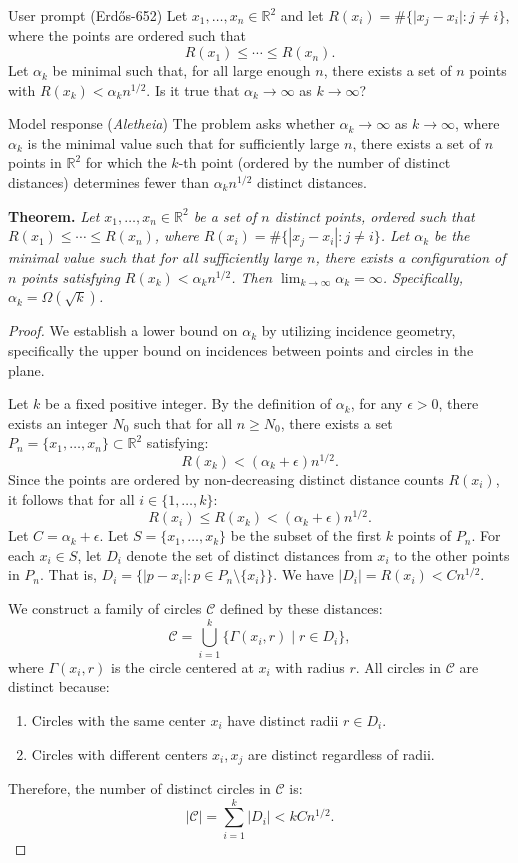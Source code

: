 \documentclass[11pt]{article}
\begin{document}
\begin{problem}{User prompt (Erd\H{o}s-652)}
Let $x_1,\ldots,x_n\in \mathbb{R}^2$ and let $R(x_i)=\#\{ \lvert x_j-x_i\rvert : j\neq i\}$, where the points are ordered such that\[R(x_1)\leq \cdots \leq R(x_n).\]Let $\alpha_k$ be minimal such that, for all large enough $n$, there exists a set of $n$ points with $R(x_k)<\alpha_kn^{1/2}$. Is it true that $\alpha_k\to \infty$ as $k\to \infty$?
\end{problem}


\begin{solution}{Model response (\emph{Aletheia})}
The problem asks whether $\alpha_k \to \infty$ as $k \to \infty$, where $\alpha_k$ is the minimal value such that for sufficiently large $n$, there exists a set of $n$ points in $\mathbb{R}^2$ for which the $k$-th point (ordered by the number of distinct distances) determines fewer than $\alpha_k n^{1/2}$ distinct distances.

\textbf{Theorem.} \textit{Let $x_1, \ldots, x_n \in \mathbb{R}^2$ be a set of $n$ distinct points, ordered such that $R(x_1) \leq \cdots \leq R(x_n)$, where $R(x_i) = \#\{ |x_j - x_i| : j \neq i \}$. Let $\alpha_k$ be the minimal value such that for all sufficiently large $n$, there exists a configuration of $n$ points satisfying $R(x_k) < \alpha_k n^{1/2}$. Then $\lim_{k \to \infty} \alpha_k = \infty$. Specifically, $\alpha_k = \Omega(\sqrt{k})$.}

\begin{proof}
We establish a lower bound on $\alpha_k$ by utilizing incidence geometry, specifically the upper bound on incidences between points and circles in the plane.

Let $k$ be a fixed positive integer. By the definition of $\alpha_k$, for any $\epsilon > 0$, there exists an integer $N_0$ such that for all $n \geq N_0$, there exists a set $P_n = \{x_1, \ldots, x_n\} \subset \mathbb{R}^2$ satisfying:
\[ R(x_k) < (\alpha_k + \epsilon) n^{1/2}. \]
Since the points are ordered by non-decreasing distinct distance counts $R(x_i)$, it follows that for all $i \in \{1, \ldots, k\}$:
\[ R(x_i) \leq R(x_k) < (\alpha_k + \epsilon) n^{1/2}. \]
Let $C = \alpha_k + \epsilon$. Let $S = \{x_1, \ldots, x_k\}$ be the subset of the first $k$ points of $P_n$. For each $x_i \in S$, let $D_i$ denote the set of distinct distances from $x_i$ to the other points in $P_n$. That is, $D_i = \{ |p - x_i| : p \in P_n \setminus \{x_i\} \}$. We have $|D_i| = R(x_i) < C n^{1/2}$.

We construct a family of circles $\mathcal{C}$ defined by these distances:
\[ \mathcal{C} = \bigcup_{i=1}^k \{ \Gamma(x_i, r) \mid r \in D_i \}, \]
where $\Gamma(x_i, r)$ is the circle centered at $x_i$ with radius $r$.
All circles in $\mathcal{C}$ are distinct because:
\begin{enumerate}
    \item Circles with the same center $x_i$ have distinct radii $r \in D_i$.
    \item Circles with different centers $x_i, x_j$ are distinct regardless of radii.
\end{enumerate}
Therefore, the number of distinct circles in $\mathcal{C}$ is:
\[ |\mathcal{C}| = \sum_{i=1}^k |D_i| < k C n^{1/2}. \]


\end{proof}
\end{solution}
\end{document}
